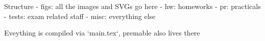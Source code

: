 Structure
- figs: all the images and SVGs go here
- hw: homeworks
- pr: practicals
- tests: exam related staff
- misc: everything else

Eveything is compiled via `main.tex`, premable also lives there